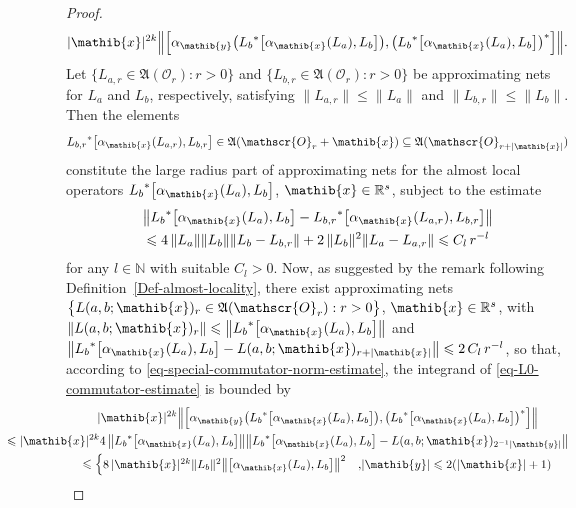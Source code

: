 \documentclass[11pt,twoside,openright]{report}
\theoremstyle{definition}
\theoremstyle{plain}
\theoremstyle{remark}
\theoremstyle{assumption}
\newcommand{\bset}[1]{\bigl\{ #1 \bigr\}}
\newcommand{\bcomm}[2]{\bigl[ #1 , #2 \bigr]}
\newcommand{\Bcomm}[2]{\Bigl[ #1 , #2 \Bigr]}
\newcommand{\abs}[1]{\lvert #1 \rvert}
\newcommand{\norm}[1]{\lVert #1 \rVert}
\newcommand{\bnorm}[1]{\bigl\lVert #1 \bigr\rVert}
\newcommand{\Bnorm}[1]{\Bigl\lVert #1 \Bigr\rVert}
\newcommand{\Nbb}{\mathbb{N}}
\newcommand{\Afrak}{\mathfrak{A}}
\newcommand{\xib}{\mathib{x}}
\newcommand{\yib}{\mathib{y}}
\newcommand{\Oscr}{\mathscr{O}}
\newcommand{\Rs}{\mathbb{R}^s}
\newcommand{\aibx}{\alpha_\mathib{x}}
\newcommand{\aiby}{\alpha_\mathib{y}}
\newcommand{\AOr}{\mathfrak{A} ( \mathscr{O}_r )}
\begin{document}
\begin{proof}
\begin{multline}
    \abs{\xib}^{2k} \Bnorm{\Bcomm{\aiby \bigl({L_b}^* \bcomm{\aibx (
    L_a )}{L_b} \bigr)}{\bigl({L_b}^* \bcomm{\aibx ( L_a )}{L_b}
    \bigr)^*}} \text{.}
  \end{multline}
  Let $\bset{ L_{a , r} \in \AOr : r > 0}$ and $\bset{ L_{b , r} \in
  \AOr : r > 0}$ be approximating nets for $L_a$ and $L_b$,
  respectively, satisfying $\norm{L_{a , r}} \leqslant \norm{L_a}$
  and $\norm{L_{b , r}} \leqslant \norm{L_b}$. Then the elements
  \begin{equation*}
    {L_{b , r}}^* \bcomm{\aibx ( L_{a , r} )}{L_{b , r}} \in \Afrak (
    \Oscr_r + \xib ) \subseteq \Afrak ( \Oscr_{r + \abs{\xib}} )
  \end{equation*}
  constitute the large radius part of approximating nets for the
  almost local operators ${L_b}^* \bcomm{\aibx ( L_a )}{L_b}$, $\xib
  \in \Rs$, subject to the estimate
  \begin{multline}
    \label{eq-commutator-approximant}
      \bnorm{{L_b}^* \bcomm{\aibx ( L_a )}{L_b} - {L_{b , r}}^*
      \bcomm{\aibx ( L_{a , r} )}{L_{b , r}}} \\
      \leqslant 4 \, \norm{L_a} \norm{L_b} \norm{L_b - L_{b , r}} + 2
      \, \norm{L_b}^2 \norm{L_a - L_{a , r}} \leqslant C_l \, r^{-l}
  \end{multline}
  for any $l \in \Nbb$ with suitable $C_l > 0$. Now, as suggested by
  the remark following Definition~\ref{Def-almost-locality}, there
  exist approximating nets $\bset{L ( a , b ; \xib )_r \in \AOr : r >
  0}$, $\xib \in \Rs$, with $\norm{L ( a , b ; \xib )_r} \leqslant
  \bnorm{{L_b}^* \bcomm{\aibx ( L_a )}{L_b}}$ and $\bnorm{{L_b}^*
  \bcomm{\aibx ( L_a )}{L_b}  - L ( a , b ; \xib )_{r + \abs{\xib}}}
  \leqslant 2 \, C_l \,  r^{-l}$, so that, according to
  \eqref{eq-special-commutator-norm-estimate}, the integrand of
  \eqref{eq-L0-commutator-estimate} is bounded by
  \begin{multline}
    \label{eq-La-Lb-commutator-estimate}
    \abs{\xib}^{2 k} \Bnorm{\Bcomm{\aiby \bigl( {L_b}^* \bcomm{\aibx (
    L_a )}{L_b} \bigr)}{\bigl( {L_b}^* \bcomm{\aibx ( L_a )}{L_b}
    \bigr)^*}} \\
    \mspace{-90mu} \leqslant \abs{\xib}^{2 k} 4 \, \bnorm{{L_b}^*
    \bcomm{\aibx ( L_a )}{L_b}} \bnorm{{L_b}^* \bcomm{\aibx ( L_a
    )}{L_b} - L ( a , b ; \xib )_{2^{-1} \abs{\yib}}} \\
    \leqslant
    \begin{cases}
      8 \, \abs{\xib}^{2 k} \norm{L_b}^2 \bnorm{\bcomm{\aibx ( L_a
      )}{L_b}}^2 & \text{,} \abs{\yib} \leqslant 2 ( \abs{\xib} + 1 )

\end{cases}
\end{multline}
\end{proof}
\end{document}

